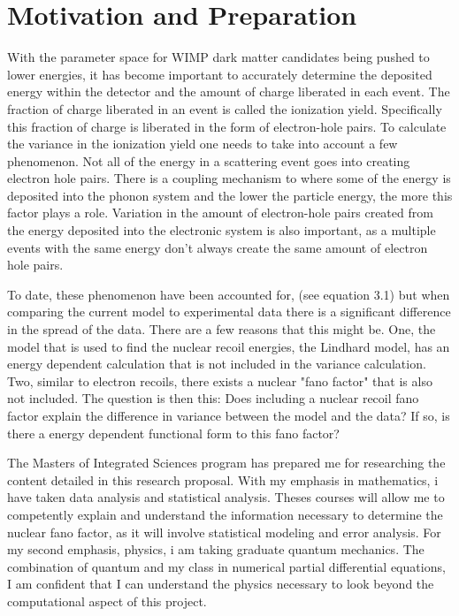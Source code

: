 \section{Motivation and Preparation}

With the parameter space for WIMP dark matter candidates being pushed to lower energies, it has become important to accurately determine the deposited energy within the detector and the amount of charge liberated in each event. The fraction of charge liberated in an event is called the ionization yield. Specifically this fraction of charge is liberated in the form of electron-hole pairs. To calculate the variance in the ionization yield one needs to take into account a few phenomenon. Not all of the energy in a scattering event goes into creating electron hole pairs. There is a coupling mechanism to where some of the energy is deposited into the phonon system and the lower the particle energy, the more this factor plays a role.\cite{Transport} Variation in the amount of electron-hole pairs created from the energy deposited into the electronic system is also important, as a multiple events with the same energy don't always create the same amount of electron hole pairs. \par
\noindent
To date, these phenomenon have been accounted for, (see equation 3.1) but when comparing the current model to experimental data there is a significant difference in the spread of the data.\cite{Kennedy} There are a few reasons that this might be. One, the model that is used to find the nuclear recoil energies, the Lindhard model, has an energy dependent calculation that is not included in the variance calculation.\cite{Lindhard_3} Two, similar to electron recoils, there exists a nuclear "fano factor" that is also not included. The question is then this: Does including a nuclear recoil fano factor explain the difference in variance between the model and the data? If so, is there a energy dependent functional form to this fano factor? \par
\noindent
The Masters of Integrated Sciences program has prepared me for researching the content detailed in this research proposal. With my emphasis in mathematics, i have taken data analysis and statistical analysis. Theses courses will allow me to competently explain and understand the information necessary to determine the nuclear fano factor, as it will involve statistical modeling and error analysis. For my second emphasis, physics, i am taking graduate quantum mechanics. The combination of quantum and my class in numerical partial differential equations, I am confident that I can understand the physics necessary to look beyond the computational aspect of this project. 


 





